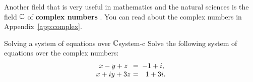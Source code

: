 Another field that is very useful in mathematics and the natural
sciences is the field $\mathbb{C}$ of \textbf{complex numbers}%
%
. You can read about the complex
numbers in Appendix~\ref{app:complex}.

\begin{example}{Solving a system of equations over $\mathbb{C}$}{system-c}
  Solve the following system of equations over the complex numbers:
  \begin{equation*}
    \begin{array}{c@{~}c@{~}c}
      x - y  + z      &=& -1+i, \\
      x + iy + 3z &=& ~~1+3i. \\
    \end{array}
  \end{equation*}
\end{example}

